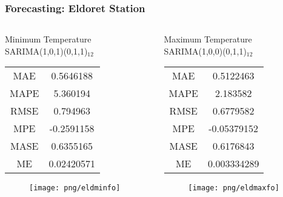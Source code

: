 \documentclass[]{beamer}
\begin{document}
\begin{frame}
	\frametitle{Forecasting: Eldoret Station}
	\fontsize{5pt}{7.5}\selectfont
	\begin{columns}
		\begin{column}{.25\textwidth}
			\begin{table}
				\begin{center}
					Minimum Temperature\\
					SARIMA(1,0,1)(0,1,1)$_{12}$\\
					\begin{tabular}{c| c}
						\hline
						MAE & 0.5646188 \\
						MAPE & 5.360194 \\
						RMSE & 0.794963 \\
						MPE & -0.2591158 \\
						MASE & 0.6355165 \\
						ME & 0.02420571 \\
					\end{tabular}	
				\end{center}
			\end{table}
			\begin{figure}[H]
			\hspace*{-2cm}\texttt{[image: png/eldminfo]}	
			\end{figure}
		\end{column}
		\begin{column}{.25\textwidth}
			\begin{table}
				\begin{center}
					Maximum Temperature\\
					SARIMA(1,0,0)(0,1,1)$_{12}$\\
					\begin{tabular}{c| c}
						\hline
						MAE & 0.5122463 \\
						MAPE & 2.183582 \\
						RMSE & 0.6779582 \\
						MPE & -0.05379152 \\
						MASE & 0.6176843 \\
						ME & 0.003334289 \\
					\end{tabular}
				\end{center}
			\end{table}
			\begin{figure}[H]	
			\hspace*{-1cm}\texttt{[image: png/eldmaxfo]}
			\end{figure}	
		\end{column}
	\end{columns}
\end{frame}
\end{document}

